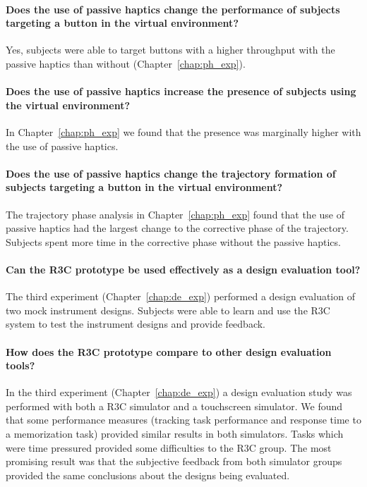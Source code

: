 \paragraph{Does the use of passive haptics change the performance of subjects targeting a button in the virtual environment?}
Yes, subjects were able to target buttons with a higher throughput with the passive haptics than without (Chapter~\ref{chap:ph_exp}).

\paragraph{Does the use of passive haptics increase the presence of subjects using the virtual environment?}
In Chapter~\ref{chap:ph_exp} we found that the presence was marginally higher with the use of passive haptics.

\paragraph{Does the use of passive haptics change the trajectory formation of subjects targeting a button in the virtual environment?}
The trajectory phase analysis in Chapter~\ref{chap:ph_exp} found that the use of passive haptics had the largest change to the corrective phase of the trajectory.
Subjects spent more time in the corrective phase without the passive haptics.

\paragraph{Can the R3C prototype be used effectively as a design evaluation tool?}
The third experiment (Chapter~\ref{chap:de_exp}) performed a design evaluation of two mock instrument designs.
Subjects were able to learn and use the R3C system to test the instrument designs and provide feedback.

\paragraph{How does the R3C prototype compare to other design evaluation tools?}
In the third experiment (Chapter~\ref{chap:de_exp}) a design evaluation study was performed with both a R3C simulator and a touchscreen simulator.
We found that some performance measures (tracking task performance and response time to a memorization task) provided similar results in both simulators.
Tasks which were time pressured provided some difficulties to the R3C group.
The most promising result was that the subjective feedback from both simulator groups provided the same conclusions about the designs being evaluated.

